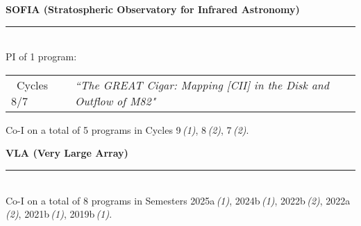 \documentclass[11pt]{article}
\makeatletter
\def\vhrulefill#1{\leavevmode\leaders\hrule \@height #1\hfill \kern\z@}
\newcommand{\subsectionname}[1]{{\large\bf #1 \vhrulefill{0.5pt}}}
\makeatother
\begin{document}

\subsectionname{SOFIA \textmd{\small (Stratospheric Observatory for Infrared Astronomy)}}\\
{PI of 1 program:}
\vspace{-6pt}
\begin{longtable}{p{}p{}}
\ Cycles 8/7 & \textit{``The GREAT Cigar: Mapping [CII] in the Disk and Outflow of M82"}\\
\end{longtable}
\vspace{-15pt}
Co-I on a total of 5 programs in Cycles 9\,{\em(1)}, 8\,{\em(2)}, 7\,{\em(2)}.\medskip


\subsectionname{VLA \textmd{\small (Very Large Array)}}\\
Co-I on a total of 8 programs in Semesters 2025a\,{\em(1)}, 2024b\,{\em(1)}, 2022b\,{\em(2)}, 2022a\,{\em(2)}, 2021b\,{\em(1)}, 2019b\,{\em(1)}.\smallskip
\end{document}
